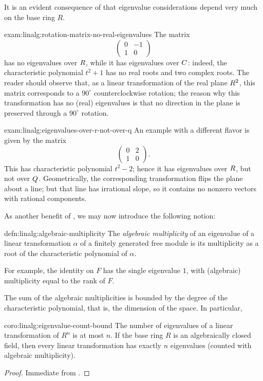 It is an evident consequence of  that eigenvalue
considerations depend very much on the base ring $R$.
\begin{exam}{}{exam:linalg:rotation-matrix-no-real-eigenvalues}
  The matrix
  \[
    \begin{pmatrix} 0 & -1 \\ 1 & 0 \end{pmatrix}
  \]
  has no eigenvalues over $R$, while it has eigenvalues over $C$:
  indeed, the characteristic polynomial $t^2 + 1$ has no real roots
  and two complex roots. The reader should observe that, as a linear
  transformation of the real plane $R^2$, this matrix corresponds to
  a $90^\circ$ counterclockwise rotation; the reason why this
  transformation has no (real) eigenvalues is that no direction in the
  plane is preserved through a $90^\circ$ rotation.
\end{exam}
\begin{exam}{}{exam:linalg:eigenvalues-over-r-not-over-q}
  An example with a different flavor is given by the matrix
  \[
    \begin{pmatrix} 0 & 2 \\ 1 & 0 \end{pmatrix}.
  \]
  This has characteristic polynomial $t^2 - 2$; hence it has
  eigenvalues over $R$, but not over $Q$. Geometrically, the
  corresponding transformation flips the plane about a line; but that
  line has irrational slope, so it contains no nonzero vectors with
  rational components.
\end{exam}
As another benefit of , we may now introduce the
following notion:
\begin{defn}{}{defn:linalg:algebraic-multiplicity}
  The \emph{algebraic multiplicity} of an eigenvalue of a linear
  transformation $\alpha$ of a finitely generated free module is its
  multiplicity as a root of the characteristic polynomial of $\alpha$.
\end{defn}
For example, the identity on $F$ has the single eigenvalue $1$, with
(algebraic) multiplicity equal to the rank of $F$.

The sum of the algebraic multiplicities is bounded by the degree of
the characteristic polynomial, that is, the dimension of the space. In
particular,
\begin{coro}{}{coro:linalg:eigenvalue-count-bound}
  The number of eigenvalues of a linear transformation of $R^n$ is at
  most $n$. If the base ring $R$ is an algebraically closed field,
  then every linear transformation has exactly $n$ eigenvalues
  (counted with algebraic multiplicity).
\end{coro}
\begin{proof}
  Immediate from .
\end{proof}

